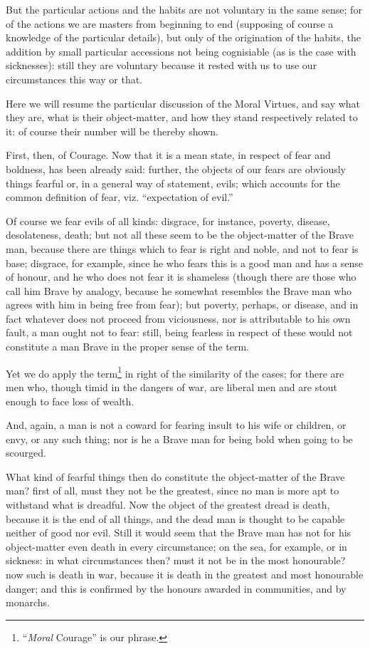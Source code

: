 But the particular actions and the habits are not voluntary in the same sense;
for of the actions we are masters from beginning to end (supposing of course a
knowledge of the particular details), but only of the origination of the
habits, the addition by small particular accessions not being cognisiable (as
is the case with sicknesses): still they are voluntary because it rested with
us to use our circumstances this way or that.


Here we will resume the particular discussion of the Moral Virtues, and say
what they are, what is their object-matter, and how they stand respectively
related to it: of course their number will be thereby shown.

First, then, of Courage. Now that it is a mean state, in respect of fear and
boldness, has been already said: further, the objects of our fears are
obviously things fearful or, in a general way of statement, evils; which
accounts for the common definition of fear, viz. “expectation of
evil.”

Of course we fear evils of all kinds: disgrace, for instance, poverty, disease,
desolateness, death; but not all these seem to be the object-matter of the
Brave man, because there are things which to fear is right and noble, and not
to fear is base; disgrace, for example, since he who fears this is a good man
and has a sense of honour, and he who does not fear it is shameless (though
there are those who call him Brave by analogy, because he somewhat resembles
the Brave man who agrees with him in being free from fear); but poverty,
perhaps, or disease, and in fact whatever does not proceed from viciousness,
nor is attributable to his own fault, a man ought not to fear: still, being
fearless in respect of these would not constitute a man Brave in the proper
sense of the term.

Yet we do apply the term\footnote{“\emph{Moral} Courage” is our phrase.}
in right of the similarity of the cases; for there are men who, though timid in
the dangers of war, are liberal men and are stout enough to face loss of
wealth.

And, again, a man is not a coward for fearing insult to his wife or children,
or envy, or any such thing; nor is he a Brave man for being bold when going to
be scourged.

What kind of fearful things then do constitute the object-matter of the Brave
man? first of all, must they not be the greatest, since no man is more apt to
withstand what is dreadful. Now the object of the greatest dread is death,
because it is the end of all things, and the dead man is thought to be capable
neither of good nor evil. Still it would seem that the Brave man has not for
his object-matter even death in every circumstance; on the sea, for example, or
in sickness: in what circumstances then? must it not be in the most honourable?
now such is death in war, because it is death in the greatest and most
honourable danger; and this is confirmed by the honours awarded in communities,
and by monarchs.

